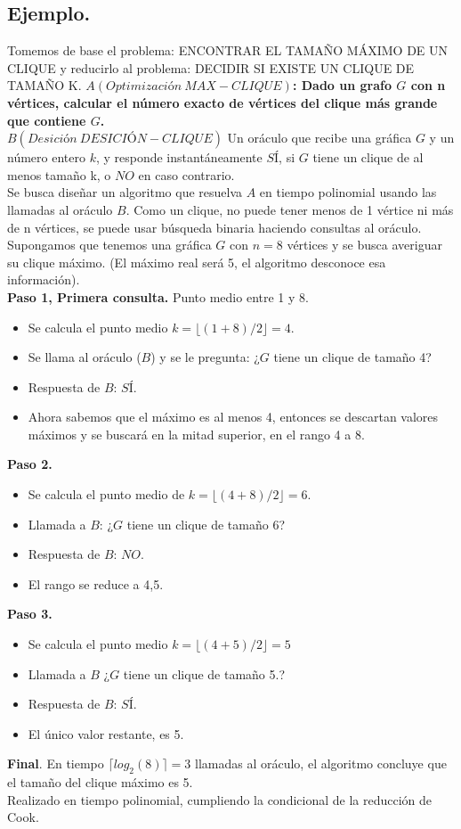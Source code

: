 \subsection{Ejemplo.}
Tomemos de base el problema: ENCONTRAR EL TAMAÑO MÁXIMO DE UN CLIQUE y reducirlo al problema: DECIDIR SI EXISTE UN CLIQUE DE TAMAÑO K.
\textbf{$A (Optimización \ MAX -CLIQUE)$: Dado un grafo $G$ con n vértices, calcular el número exacto de vértices del clique más grande que contiene $G$.} \\
\textbf{$B (Desición\ DESICIÓN-CLIQUE)$} Un oráculo que recibe una gráfica $G$ y un número entero $k$, y responde instantáneamente $SÍ$, si $G$ tiene un clique de al menos tamaño k, o $NO$ en caso contrario.\\
Se busca diseñar un algoritmo que resuelva $A$ en tiempo polinomial usando las llamadas al oráculo $B$. Como un clique, no puede tener menos de 1 vértice ni más de n vértices, se puede usar búsqueda binaria haciendo consultas al oráculo.\\
Supongamos que tenemos una gráfica $G$ con $n=8$ vértices y se busca averiguar su clique máximo. (El máximo real será 5, el algoritmo desconoce esa información). \\
\textbf{Paso 1, Primera consulta.}
Punto medio entre 1 y 8.
\begin{itemize}
    \item Se calcula el punto medio $k = \lfloor(1+8)/2  \rfloor = 4.$
    \item Se llama al oráculo ($B$) y se le pregunta: ¿$G$ tiene un clique de tamaño 4?
    \item Respuesta de $B$: $SÍ$.
    \item Ahora sabemos que el máximo es al menos 4, entonces se descartan valores máximos y se buscará en la mitad superior, en el rango 4 a 8.
\end{itemize}
\textbf{Paso 2.}
\begin{itemize}
    \item Se calcula el punto medio de $k=\lfloor (4+8)/2 \rfloor=6$.
    \item Llamada a $B$: ¿$G$ tiene un clique de tamaño 6?
    \item Respuesta de $B$: $NO.$
    \item El rango se reduce a 4,5.
\end{itemize}
\textbf{Paso 3.}
\begin{itemize}
    \item Se calcula el punto medio $k=\lfloor (4+5)/2 \rfloor=5$
    \item Llamada a $B$ ¿$G$ tiene un clique de tamaño 5.?
    \item Respuesta de $B$: $SÍ.$
    \item El único valor restante, es 5.
\end{itemize}
\textbf{Final}.
En tiempo $\lceil log_2(8)  \rceil = 3$ llamadas al oráculo, el algoritmo concluye que el tamaño del clique máximo es 5. \\
Realizado en tiempo polinomial, cumpliendo la condicional de la reducción de Cook.

